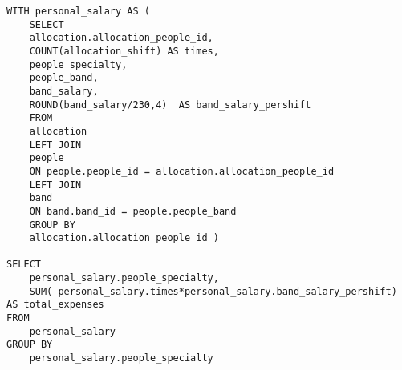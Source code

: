 \documentclass{article}
\begin{document}
\begin{lstlisting}[style=sqlstyle]
WITH personal_salary AS (
    SELECT 
	allocation.allocation_people_id,
	COUNT(allocation_shift) AS times,
	people_specialty,
	people_band,
	band_salary,
	ROUND(band_salary/230,4)  AS band_salary_pershift 
    FROM 
	allocation
    LEFT JOIN
	people
	ON people.people_id = allocation.allocation_people_id
    LEFT JOIN
	band
	ON band.band_id = people.people_band
    GROUP BY
	allocation.allocation_people_id )
		
SELECT 
    personal_salary.people_specialty,
    SUM( personal_salary.times*personal_salary.band_salary_pershift) AS total_expenses
FROM 
    personal_salary
GROUP BY 
    personal_salary.people_specialty


\end{lstlisting}
\end{document}
